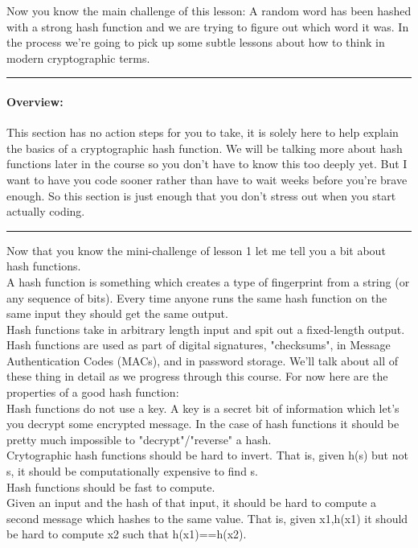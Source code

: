 \documentclass[12pt]{article}
\newenvironment{overview}
  {\noindent\rule{\textwidth}{0.4pt}
  \paragraph{Overview:}
  }
  {\par
  \noindent\rule{\textwidth}{0.4pt}
  }
\begin{document}
 Now you know the main challenge of this lesson: A random word has been hashed with a strong hash function and we are trying to figure out which word it was. In the process we're going to pick up some subtle lessons about how to think in modern cryptographic terms.

\begin{overview}
This section has no action steps for you to take, it is solely here to help explain the basics of a cryptographic hash function. We will be talking more about hash functions later in the course so you don't have to know this too deeply yet. But I want to have you code sooner rather than have to wait weeks before you're brave enough. So this section is just enough that you don't stress out when you start actually coding.
\end{overview}

Now that you know the mini-challenge of lesson 1 let me tell you a bit about hash functions.\\

A hash function is something which creates a type of fingerprint from a string (or any sequence of bits). Every time anyone runs the same hash function on the same input they should get the same output.\\

Hash functions take in arbitrary length input and spit out a fixed-length output.\\

Hash functions are used as part of digital signatures, "checksums", in Message Authentication Codes (MACs), and in password storage. We'll talk about all of these thing in detail as we progress through this course. For now here are the properties of a good hash function:\\

    Hash functions do not use a key. A key is a secret bit of information which let's you decrypt some encrypted message. In the case of hash functions it should be pretty much impossible to "decrypt"/"reverse" a hash.\\
    Crytographic hash functions should be hard to invert. That is, given h(s) but not s, it should be computationally expensive to find s.\\

Hash functions should be fast to compute.\\

Given an input and the hash of that input, it should be hard to compute a second message which hashes to the same value. That is, given x1,h(x1) it should be hard to compute x2 such that h(x1)==h(x2).\\
\end{document}
